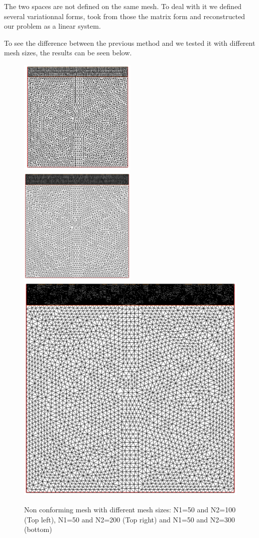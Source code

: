 \documentclass{article}
\begin{document}
The two spaces are not defined on the same mesh. To deal with it we defined
several variationnal forms, took from those the matrix form and reconstructed
our problem as a linear system.

To see the difference between the previous method and we tested it with
different mesh sizes, the results can be seen below.

\begin{figure}[h]
	\includegraphics[width=0.5\textwidth]{imgs/Mesh_100_50.PNG}
	\includegraphics[width=0.5\textwidth]{imgs/Mesh_200_50.PNG}
	\includegraphics[width=\textwidth]{imgs/Mesh_300_50.PNG}
	\caption{Non conforming mesh with different mesh sizes: N1=50 and N2=100 (Top left), N1=50 and N2=200 (Top right) and N1=50 and N2=300 (bottom)}
    \label{fig:Meshes}
\end{figure}
\end{document}
